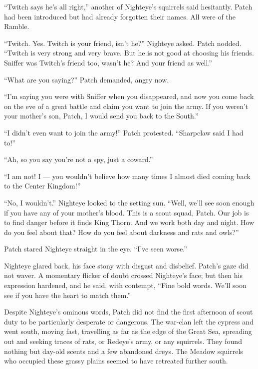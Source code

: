\documentclass[ebook,oneside,openany,17pt]{memoir}
\newenvironment{tolerant}[1]{%
  \par\tolerance=#1\relax
}{%
  \par
}
\begin{document}
“Twitch says he’s all right,” another of Nighteye’s squirrels said
hesitantly. Patch had been introduced but had already forgotten their
names. All were of the Ramble.

\begin{tolerant}{5000}
“Twitch. Yes. Twitch is your friend, isn’t he?” Nighteye asked. Patch
nodded. “Twitch is very strong and very brave. But he is not good at
choosing his friends. Sniffer was Twitch’s friend too, wasn’t he? And
your friend as well.”
\end{tolerant}

“What are you saying?” Patch demanded, angry now.

“I’m saying you were with Sniffer when you disappeared, and now you
come back on the eve of a great battle and claim you want to join the
army. If you weren’t your mother’s son, Patch, I would send you back
to the South.”

\begin{tolerant}{1000}
“I didn’t even want to join the army!” Patch pro\-tested. “Sharpclaw
said I had to!”
\end{tolerant}

“Ah, so you say you’re not a spy, just a coward.”

“I am not! I — you wouldn’t believe how many times I almost died
coming back to the Center Kingdom!”

“No, I wouldn’t.” Nighteye looked to the setting sun. “Well, we’ll see
soon enough if you have any of your mother’s blood. This is a scout
squad, Patch. Our job is to find danger before it finds King
Thorn. And we work both day and night. How do you feel about that? How
do you feel about darkness and rats and owls?”

Patch stared Nighteye straight in the eye. “I’ve seen worse.”

\begin{tolerant}{1000}
Nighteye glared back, his face stony with disgust and
disbelief. Patch’s gaze did not waver. A momentary flicker of doubt
crossed Nighteye’s face; but then his expression hardened, and he
said, with contempt, “Fine bold words. We’ll soon see if you have the
heart to match them.”
\end{tolerant}

Despite Nighteye’s ominous words, Patch did not find the first
afternoon of scout duty to be particularly desperate or dangerous. The
war-clan left the cypress and went south, moving fast, travelling as
far as the edge of the Great Sea, spreading out and seeking traces of
rats, or Redeye’s army, or any squirrels. They found nothing but
day-old scents and a few abandoned dreys. The Meadow squirrels who
occupied these grassy plains seemed to have retreated further south.
\end{document}
